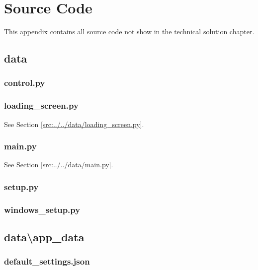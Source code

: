 \documentclass[../main/main.tex]{subfiles}
\begin{document}
\newpage

\chapter{Source Code}

This appendix contains all source code not show in the technical solution chapter.

\section{data}
\subsection{control.py}

\label{src:data/control.py}

\subsection{loading\_screen.py}
See Section \ref{src:../../data/loading_screen.py}.

\subsection{main.py}
See Section \ref{src:../../data/main.py}.

\subsection{setup.py}

\label{src:data/setup.py}

\subsection{windows\_setup.py}

\label{src:data/windows_setup.py}

\section{data\textbackslash app\_data}
\subsection{default\_settings.json}

\label{src:data/app_data/default_settings.json}
\end{document}
